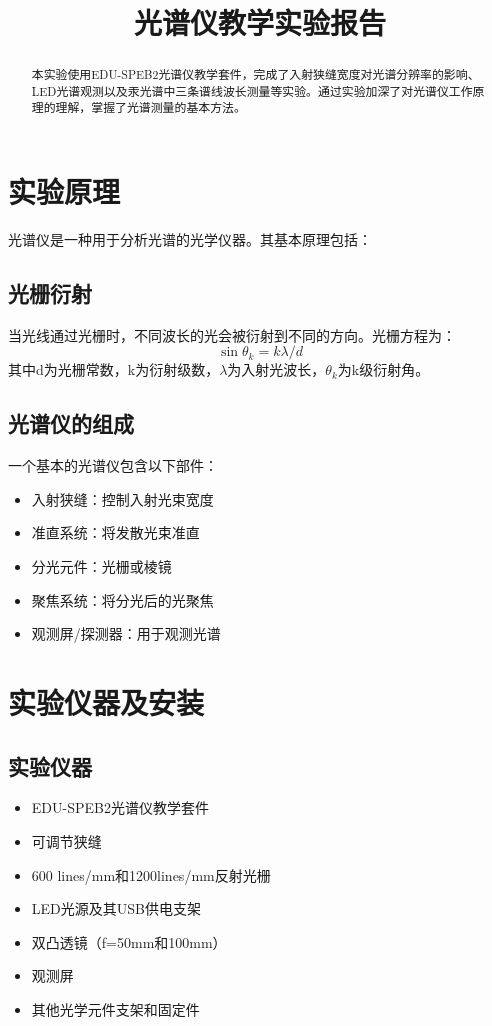 \documentclass{ctexart}
\title{光谱仪教学实验报告}
\begin{document}
\maketitle

\begin{abstract}
本实验使用EDU-SPEB2光谱仪教学套件，完成了入射狭缝宽度对光谱分辨率的影响、LED光谱观测以及汞光谱中三条谱线波长测量等实验。通过实验加深了对光谱仪工作原理的理解，掌握了光谱测量的基本方法。
\end{abstract}

\section{实验原理}

光谱仪是一种用于分析光谱的光学仪器。其基本原理包括：

\subsection{光栅衍射}
当光线通过光栅时，不同波长的光会被衍射到不同的方向。光栅方程为：
\[ \sin \theta_k = k\lambda/d \]
其中d为光栅常数，k为衍射级数，$\lambda$为入射光波长，$\theta_k$为k级衍射角。

\subsection{光谱仪的组成}
一个基本的光谱仪包含以下部件：
\begin{itemize}
    \item 入射狭缝：控制入射光束宽度
    \item 准直系统：将发散光束准直
    \item 分光元件：光栅或棱镜
    \item 聚焦系统：将分光后的光聚焦
    \item 观测屏/探测器：用于观测光谱
\end{itemize}

\section{实验仪器及安装}
\subsection{实验仪器}
\begin{itemize}
    \item EDU-SPEB2光谱仪教学套件
    \item 可调节狭缝
    \item 600 lines/mm和1200lines/mm反射光栅
    \item LED光源及其USB供电支架
    \item 双凸透镜（f=50mm和100mm）
    \item 观测屏
    \item 其他光学元件支架和固定件
\end{itemize}
\end{document}
